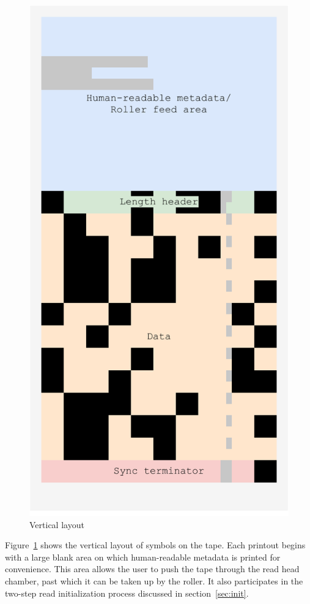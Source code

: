 \documentclass{article}
\begin{document}
\begin{landscape}
\begin{figure}[h]
				\includegraphics[width=\linewidth]{img/vertical}
				\caption{Vertical layout}
				\label{fig:vertical}
			\endminipage
		\end{figure}
	\end{landscape}
	
	Figure~\ref{fig:vertical} shows the vertical layout of symbols on the tape.
	Each printout begins with a large blank area on which human-readable
	metadata is printed for convenience. This area allows the user to push the
	tape through the read head chamber, past which it can be taken up by the
	roller. It also participates in the two-step read initialization process
	discussed in section~\ref{sec:init}.
	
\end{document}
